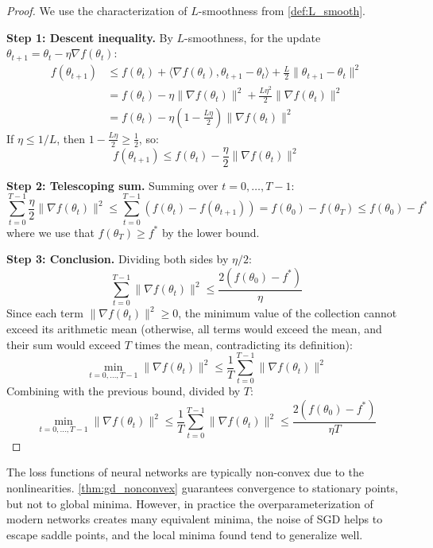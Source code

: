 \begin{proof}
	We use the characterization of \(L\)-smoothness from \autoref{def:L_smooth}.

	\textbf{Step 1: Descent inequality.}
	By \(L\)-smoothness, for the update \(\theta_{t+1} = \theta_t - \eta \nabla f(\theta_t)\):
	\begin{align*}
		f(\theta_{t+1}) &\leq f(\theta_t) + \langle \nabla f(\theta_t), \theta_{t+1} - \theta_t \rangle + \frac{L}{2}\|\theta_{t+1} - \theta_t\|^2 \\
		&= f(\theta_t) - \eta \|\nabla f(\theta_t)\|^2 + \frac{L\eta^2}{2}\|\nabla f(\theta_t)\|^2 \\
		&= f(\theta_t) - \eta\left(1 - \frac{L\eta}{2}\right)\|\nabla f(\theta_t)\|^2
	\end{align*}
	If \(\eta \leq 1/L\), then \(1 - \frac{L\eta}{2} \geq \frac{1}{2}\), so:
	\[
		f(\theta_{t+1}) \leq f(\theta_t) - \frac{\eta}{2}\|\nabla f(\theta_t)\|^2
	\]

	\textbf{Step 2: Telescoping sum.}
	Summing over \(t = 0, \ldots, T-1\):
	\[
		\sum_{t=0}^{T-1} \frac{\eta}{2}\|\nabla f(\theta_t)\|^2 \leq \sum_{t=0}^{T-1} \left(f(\theta_t) - f(\theta_{t+1})\right) = f(\theta_0) - f(\theta_T) \leq f(\theta_0) - f^*
	\]
	where we use that \(f(\theta_T) \geq f^*\) by the lower bound.

	\textbf{Step 3: Conclusion.}
	Dividing both sides by \(\eta/2\):
	\[
		\sum_{t=0}^{T-1} \|\nabla f(\theta_t)\|^2 \leq \frac{2(f(\theta_0) - f^*)}{\eta}
	\]
	Since each term \(\|\nabla f(\theta_t)\|^2 \geq 0\), the minimum value of the collection cannot exceed its arithmetic mean (otherwise, all terms would exceed the mean, and their sum would exceed \(T\) times the mean, contradicting its definition):
	\[
		\min_{t=0,\ldots,T-1} \|\nabla f(\theta_t)\|^2 \leq \frac{1}{T}\sum_{t=0}^{T-1} \|\nabla f(\theta_t)\|^2
	\]
	Combining with the previous bound, divided by \(T\):
	\[
		\min_{t=0,\ldots,T-1} \|\nabla f(\theta_t)\|^2 \leq \frac{1}{T}\sum_{t=0}^{T-1} \|\nabla f(\theta_t)\|^2 \leq \frac{2(f(\theta_0) - f^*)}{\eta T}
	\]
\end{proof}

The loss functions of neural networks are typically non-convex due to the nonlinearities. \autoref{thm:gd_nonconvex} guarantees convergence to stationary points, but not to global minima. However, in practice the overparameterization of modern networks creates many equivalent minima, the noise of \gls{SGD} helps to escape saddle points, and the local minima found tend to generalize well.

